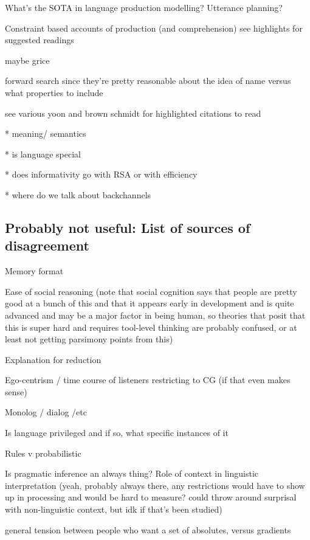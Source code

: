 \documentclass[]{article}
\begin{document}


What's the SOTA in language production modelling? Utterance planning? 

Constraint based accounts of production (and comprehension) see \cite{hanna2003} highlights for suggested readings

maybe grice

forward search \cite{heller2012} since they're pretty reasonable about the idea of name versus what properties to include 


see various yoon and brown schmidt for highlighted citations to read 


* meaning/ semantics

* is language special 

* does informativity go with RSA or with efficiency 

* where do we talk about backchannels 


\subsection{Probably not useful: List of sources of disagreement}

Memory format 

Ease of social reasoning (note that social cognition says that people are pretty good at a bunch of this and that it appears early in development and is quite advanced and may be a major factor in being human, so theories that posit that this is super hard and requires tool-level thinking are probably confused, or at least not getting parsimony points from this)

Explanation for reduction

Ego-centrism / time course of listeners restricting to CG (if that even makes sense)

Monolog / dialog /etc 

Is language privileged and if so, what specific instances of it

Rules v probabilistic

Is pragmatic inference an always thing? Role of context in linguistic interpretation (yeah, probably always there, any restrictions would have to show up in processing and would be hard to measure? could throw around surprisal with non-linguistic context, but idk if that's been studied) 

general tension between people who want a set of absolutes, versus gradients
\end{document}
